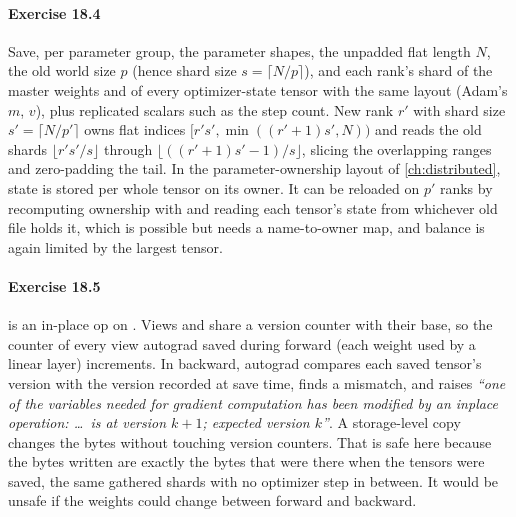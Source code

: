 \paragraph{Exercise 18.4}
Save, per parameter group, the parameter shapes, the unpadded flat length $N$, the old world size $p$
(hence shard size $s=\lceil N/p\rceil$), and each rank's shard of the master weights and of every
optimizer-state tensor with the same layout (Adam's $m$, $v$), plus replicated scalars such as the step
count. New rank $r'$ with shard size $s'=\lceil N/p'\rceil$ owns flat indices
$[r's', \min((r'+1)s', N))$ and reads the old shards $\lfloor r's'/s\rfloor$ through
$\lfloor((r'+1)s'-1)/s\rfloor$, slicing the overlapping ranges and zero-padding the tail. In the
parameter-ownership layout of \cref{ch:distributed}, state is stored per whole tensor on its owner. It can
be reloaded on $p'$ ranks by recomputing ownership with  and reading each
tensor's state from whichever old file holds it, which is possible but needs a name-to-owner map, and
balance is again limited by the largest tensor.

\paragraph{Exercise 18.5}
 is an in-place op on . Views and  share a version
counter with their base, so the counter of every view autograd saved during forward (each weight used
by a linear layer) increments. In backward, autograd compares each saved tensor's version with the
version recorded at save time, finds a mismatch, and raises \emph{``one of the variables needed for
gradient computation has been modified by an inplace operation: \dots\ is at version $k+1$; expected
version $k$''}. A storage-level copy changes the bytes without touching version counters. That is
safe here because the bytes written are exactly the bytes that were there when the tensors were saved,
the same gathered shards with no optimizer step in between. It would be unsafe if the weights could
change between forward and backward.

